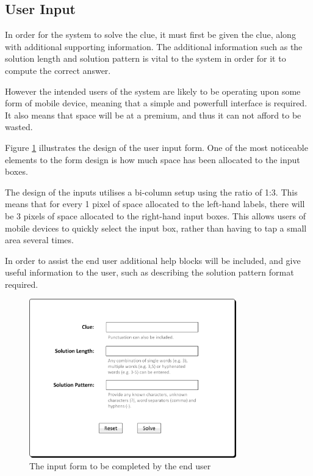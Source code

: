 \subsection{User Input} 
\label{sub:user_input}

In order for the system to solve the clue, it must first be given the clue, 
along with additional supporting information. The additional information such as 
the solution length and solution pattern is vital to the system in order for it 
to compute the correct answer. 

However the intended users of the system are likely to be operating upon some 
form of mobile device, meaning that a simple and powerfull interface is required. It
also means that space will be at a premium, and thus it can not afford to be 
wasted.

Figure \ref{fig:input_form} illustrates the design of the user input form. One 
of the most noticeable elements to the form design is how much space has been 
allocated to the input boxes. 

The design of the inputs utilises a bi-column setup using the ratio of 1:3. This
means that for every 1 pixel of space allocated to the left-hand labels, there 
will be 3 pixels of space allocated to the right-hand input boxes. This allows 
users of mobile devices to quickly select the input box, rather than having to 
tap a small area several times.

In order to assist the end user additional help blocks will be included, and 
give useful information to the user, such as describing the solution pattern 
format required.

\begin{figure}[H]
  \centering
  \includegraphics[width=0.8\textwidth]{ui/form.jpg}
  \caption{The input form to be completed by the end user}
  \label{fig:input_form}
\end{figure}

